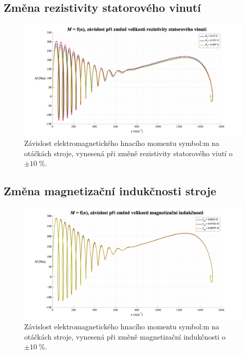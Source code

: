 \documentclass[a4paper, twoside, 11pt]{article}
\newcommand{\fbar}{\FloatBarrier}
\begin{document}
    \subsection{Změna rezistivity statorového vinutí}
        \begin{figure}[htbp!]
            \centering
            \includegraphics[width=1\textwidth]{src/png/mh_dyn_nGraphR1.png}
            \caption{Závislost elektromagnetického hnacího momentu \gls{symbol:m} na otáčkách stroje, vynesená při změně rezistivity statorového viutí o~$\pm 10\;\%$.}
            \label{fig:mh_dyn_nGraphR1}
        \end{figure}

\newpage

    \fbar
    \subsection{Změna magnetizační indukčnosti stroje}
        \begin{figure}[htbp!]
            \centering
            \includegraphics[width=1\textwidth]{src/png/mh_dyn_nGraphLm.png}
            \caption{Závislost elektromagnetického hnacího momentu \gls{symbol:m} na otáčkách stroje, vynesená při změně magnetizační indukčnosti o~$\pm 10\;\%$.}
            \label{fig:mh_dyn_nGraphLm}
        \end{figure}
\end{document}
